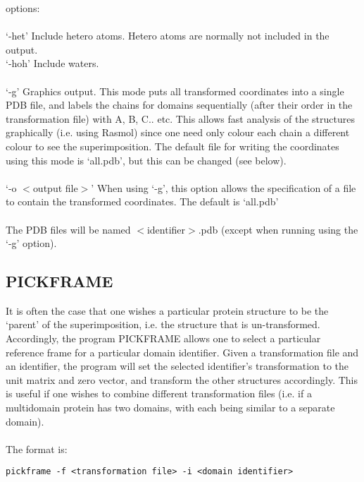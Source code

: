 options:\\
\\
`-het' Include hetero atoms.  Hetero atoms are normally not included
in the output.\\
`-hoh' Include waters.\\
\\
`-g' Graphics output.  This mode puts all transformed coordinates
into a single PDB file, and labels the chains for domains
sequentially (after their order in the transformation file) with A,
B, C.. etc.  This allows fast analysis of the structures
graphically (i.e. using Rasmol) since one need only colour each
chain a different colour to see the superimposition.  The default
file for writing the coordinates using this mode is `all.pdb', but
this can be changed (see below).\\
\\
`-o $<$output file$>$'  When using `-g', this option allows the
specification of a file to contain the transformed coordinates.
The default is `all.pdb'\\
\\
The PDB files will be named $<$identifier$>$.pdb (except when running using the `-g'
option).

\subsection{PICKFRAME}

It is often the case that one wishes a particular protein structure
to be the `parent' of the superimposition, i.e. the structure that
is un-transformed.  Accordingly, the program PICKFRAME allows
one to select a particular reference frame for a particular domain
identifier.  Given a transformation file and an identifier, the
program will set the selected identifier's transformation to the
unit matrix and zero vector, and transform the other structures
accordingly.  This is useful if one wishes to combine different
transformation files (i.e. if a multidomain protein has
two domains, with each being similar to a separate domain).\\
\\
The format is:\\

\begin{scriptsize}\begin{verbatim}
pickframe -f <transformation file> -i <domain identifier>
\end{verbatim} \end{scriptsize}

